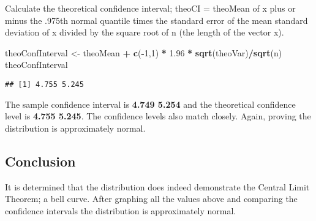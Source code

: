 \documentclass[]{article}
\newenvironment{Shaded}{\begin{snugshade}}{\end{snugshade}}
\newcommand{\KeywordTok}[1]{\textcolor[rgb]{0.13,0.29,0.53}{\textbf{#1}}}
\newcommand{\DecValTok}[1]{\textcolor[rgb]{0.00,0.00,0.81}{#1}}
\newcommand{\FloatTok}[1]{\textcolor[rgb]{0.00,0.00,0.81}{#1}}
\newcommand{\StringTok}[1]{\textcolor[rgb]{0.31,0.60,0.02}{#1}}
\newcommand{\OperatorTok}[1]{\textcolor[rgb]{0.81,0.36,0.00}{\textbf{#1}}}
\newcommand{\NormalTok}[1]{#1}
\begin{document}
Calculate the theoretical confidence interval; theoCI = theoMean of x
plus or minus the .975th normal quantile times the standard error of the
mean standard deviation of x divided by the square root of n (the length
of the vector x).

\begin{Shaded}
\begin{Highlighting}[]
\NormalTok{theoConfInterval <-}\StringTok{ }\NormalTok{theoMean }\OperatorTok{+}\StringTok{ }\KeywordTok{c}\NormalTok{(}\OperatorTok{-}\DecValTok{1}\NormalTok{,}\DecValTok{1}\NormalTok{) }\OperatorTok{*}\StringTok{ }\FloatTok{1.96} \OperatorTok{*}\StringTok{ }\KeywordTok{sqrt}\NormalTok{(theoVar)}\OperatorTok{/}\KeywordTok{sqrt}\NormalTok{(n)}
\NormalTok{theoConfInterval}
\end{Highlighting}
\end{Shaded}

\begin{verbatim}
## [1] 4.755 5.245
\end{verbatim}

The sample confidence interval is \textbf{4.749 5.254} and the
theoretical confidence level is \textbf{4.755 5.245}. The confidence
levels also match closely. Again, proving the distribution is
approximately normal.

\subsection{Conclusion}\label{conclusion}

It is determined that the distribution does indeed demonstrate the
Central Limit Theorem; a bell curve. After graphing all the values above
and comparing the confidence intervals the distribution is approximately
normal.
\end{document}
